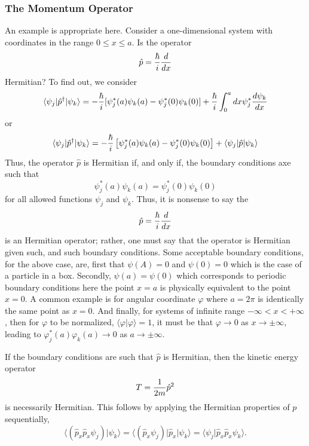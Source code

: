 \subsubsection{The Momentum Operator}
    
An example is appropriate here. Consider a one-dimensional system with coordinates
in the range $0 \leq x \leq a$. Is the operator
\begin{equation}
{\hat p} = {\hbar \over i} {d \over dx}
\end{equation}
Hermitian? To find out, we consider
\begin{equation}
 \langle\psi_j\vert{\hat p}^{\dag}\vert\psi_k\rangle 
   = - {\hbar \over i} 
      [\psi_j^*(a)\psi_k(a)-\psi_j^*(0)\psi_k(0)]
 + {\hbar\over i}\int^{a}_{0} dx\psi_j^*{d\psi_k\over dx}
\end{equation}
or 
\begin{equation}
\langle \psi_j \vert {\hat p}^{\dag} \vert \psi_k \rangle = - {\hbar \over i} 
\left[ \psi ^*_j (a) \psi_k (a) - \psi ^*_j (0) \psi_k (0) \right] + \langle 
\psi_j \vert {\hat p} \vert \psi_k \rangle
\end{equation}
Thus, the operator ${\hat p}$ is Hermitian if, and only if, the boundary 
conditions axe such that
\begin{equation}
\psi ^*_j (a) \psi_k (a) = \psi ^*_j (0) \psi_k (0)
\end{equation}
for all allowed functions $\psi_j$ and $\psi_k$. Thus, it is nonsense to say the
\begin{equation}
{\hat p} = {\hbar \over i} {d \over dx}
\end{equation}
is an Hermitian operator; rather, one must say that the operator is Hermitian given
such, and such boundary conditions. Some acceptable boundary conditions, for the
above case, are, first that $\psi (A) = 0$ and $\psi (0) = 0$ which is the case of 
a particle in a box. Secondly, $\psi (a) = \psi (0)$ which corresponds to 
periodic boundary conditions here the point $x = a$ is physically equivalent 
to the point $x = 0$.  A common example is for angular coordinate 
$\varphi$ where $a = 2 \pi$ is identically the same point as $x = 
0$.  And finally, for systems of infinite range $- \infty < x < + 
\infty$, then for $\varphi$ to be normalized, $ \langle \varphi \vert 
\varphi \rangle = 1$, it must be that $\varphi \rightarrow 0$ as $x 
\rightarrow \pm \infty$, leading to $\varphi_j ^* (a) \varphi_k (a) 
\rightarrow 0$ as $a \rightarrow \pm \infty$. 

If the boundary conditions are such that $\hat p$ is Hermitian, then the kinetic 
energy operator
\begin{equation}
T = {1 \over 2m} {\hat p}^2
\end{equation}
is necessarily Hermitian. This follows by applying the Hermitian properties
of $p$ sequentially,
\begin{equation}
\langle \left( {\hat p}_x {\hat p}_x \psi_j \right) \vert \psi_k \rangle = \langle 
\left( {\hat p}_x \psi_j \right) \vert {\hat p}_x \vert \psi_k \rangle = \langle 
\psi_j \vert {\hat p}_x {\hat p}_x \psi_k \rangle .
\end{equation}

